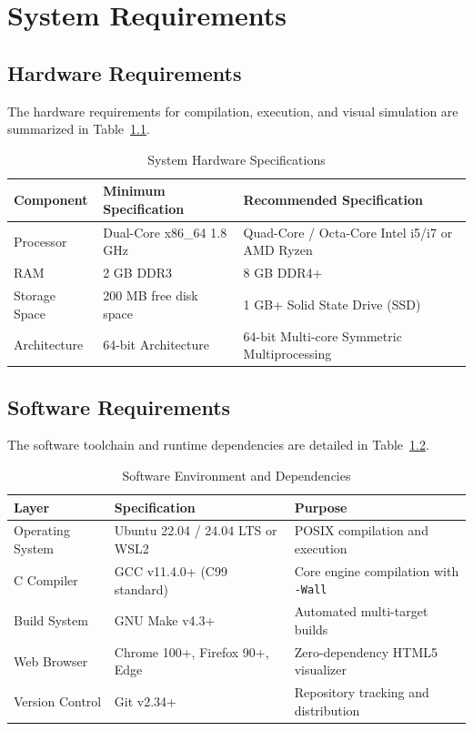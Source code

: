\documentclass[12pt,a4paper]{report}
\begin{document}
\chapter{System Requirements}\label{ch3}

\section{Hardware Requirements}
The hardware requirements for compilation, execution, and visual simulation are summarized in Table~\ref{tab:hardware_req}.

\begin{table}[H]
\centering
\caption{System Hardware Specifications}
\label{tab:hardware_req}
\small
\begin{tabularx}{\textwidth}{|p{3.5cm}|X|X|}
\hline
\rowcolor{codebg}
\textbf{Component} & \textbf{Minimum Specification} & \textbf{Recommended Specification} \\
\hline
Processor & Dual-Core x86\_64 1.8 GHz & Quad-Core / Octa-Core Intel i5/i7 or AMD Ryzen \\
\hline
RAM & 2 GB DDR3 & 8 GB DDR4+ \\
\hline
Storage Space & 200 MB free disk space & 1 GB+ Solid State Drive (SSD) \\
\hline
Architecture & 64-bit Architecture & 64-bit Multi-core Symmetric Multiprocessing \\
\hline
\end{tabularx}
\end{table}

\section{Software Requirements}
The software toolchain and runtime dependencies are detailed in Table~\ref{tab:software_req}.

\begin{table}[H]
\centering
\caption{Software Environment and Dependencies}
\label{tab:software_req}
\small
\begin{tabularx}{\textwidth}{|p{3.2cm}|X|p{4.2cm}|}
\hline
\rowcolor{codebg}
\textbf{Layer} & \textbf{Specification} & \textbf{Purpose} \\
\hline
Operating System & Ubuntu 22.04 / 24.04 LTS or WSL2 & POSIX compilation and execution \\
\hline
C Compiler & GCC v11.4.0+ (C99 standard) & Core engine compilation with \texttt{-Wall} \\
\hline
Build System & GNU Make v4.3+ & Automated multi-target builds \\
\hline
Web Browser & Chrome 100+, Firefox 90+, Edge & Zero-dependency HTML5 visualizer \\
\hline
Version Control & Git v2.34+ & Repository tracking and distribution \\
\hline
\end{tabularx}
\end{table}
\end{document}
